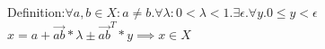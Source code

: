 Definition:$ \forall a,b \in X: a\neq b. \forall \lambda : 0<\lambda<1. \exists \epsilon. \forall y. 0\le y < \epsilon$ \\
$x = a+ \vec{ab}*\lambda \pm \vec{ab}^T*y \implies x \in X$ 